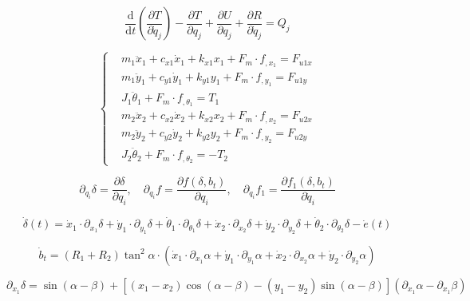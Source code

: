 \begin{equation}
	\frac{\mathrm{d}}{\mathrm{d}t} \left( \frac{\partial T}{\partial \dot{q}_j} \right) - \frac{\partial T}{\partial q_j} + \frac{\partial U}{\partial q_j} + \frac{\partial R}{\partial \dot{q}_j} = Q_j
	\label{eq:lagrange}
\end{equation}

\begin{equation}
	\left\{
	\begin{aligned}
		& m_1\ddot{x}_1 + c_{x1}\dot{x}_1 + k_{x1}x_1 + F_m \cdot f_{,x_1} = F_{u1x} \\
		& m_1\ddot{y}_1 + c_{y1}\dot{y}_1 + k_{y1}y_1 + F_m \cdot f_{,y_1} = F_{u1y} \\
		& J_1\ddot{\theta}_1 + F_m \cdot f_{,\theta_1} = T_1 \\
		& m_2\ddot{x}_2 + c_{x2}\dot{x}_2 + k_{x2}x_2 + F_m \cdot f_{,x_2} = F_{u2x} \\
		& m_2\ddot{y}_2 + c_{y2}\dot{y}_2 + k_{y2}y_2 + F_m \cdot f_{,y_2} = F_{u2y} \\
		& J_2\ddot{\theta}_2 + F_m \cdot f_{,\theta_2} = -T_2
	\end{aligned}
	\right.
	\label{eq:sistema_movimento_simplificado}
\end{equation}

\begin{equation}
	\partial_{q_i}\delta = \frac{\partial \delta}{\partial q_i}, \quad \partial_{q_i}f = \frac{\partial f(\delta, b_t)}{\partial q_i}, \quad \partial_{\dot{q}_i}f_1 = \frac{\partial f_1(\delta, b_t)}{\partial \dot{q}_i}
	\label{eq:derivadas_genericas}
\end{equation}

\begin{equation}
	\dot{\delta}(t) = \dot{x}_1 \cdot \partial_{x_1}\delta + \dot{y}_1 \cdot \partial_{y_1}\delta + \dot{\theta}_1 \cdot \partial_{\theta_1}\delta + \dot{x}_2 \cdot \partial_{x_2}\delta + \dot{y}_2 \cdot \partial_{y_2}\delta + \dot{\theta}_2 \cdot \partial_{\theta_2}\delta - \dot{e}(t)
	\label{eq:dot_delta}
\end{equation}

\begin{equation}
	\dot{b}_t = (R_1 + R_2) \tan^2 \alpha \cdot (\dot{x}_1 \cdot \partial_{x_1}\alpha + \dot{y}_1 \cdot \partial_{y_1}\alpha + \dot{x}_2 \cdot \partial_{x_2}\alpha + \dot{y}_2 \cdot \partial_{y_2}\alpha)
	\label{eq:dot_bt}
\end{equation}

\begin{equation}
	\partial_{x_1}\delta = \sin(\alpha - \beta) + [(x_1 - x_2) \cos(\alpha - \beta) - (y_1 - y_2) \sin(\alpha - \beta)](\partial_{x_1}\alpha - \partial_{x_1}\beta)
	\label{eq:delta_x1}
\end{equation}

